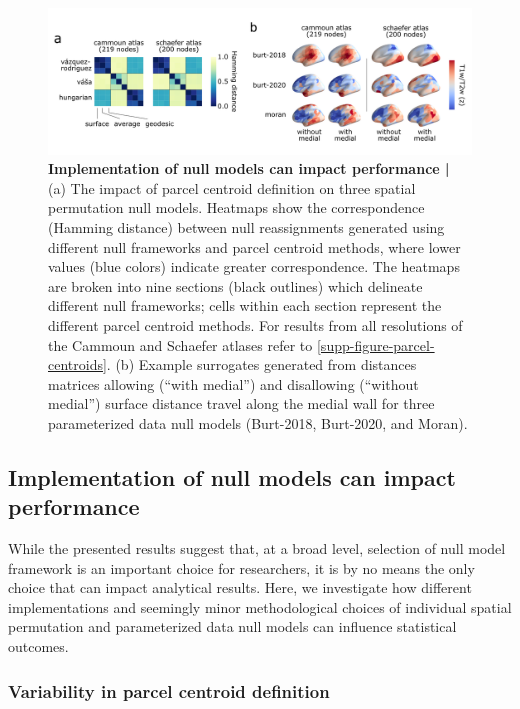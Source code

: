 \documentclass[12pt,aps,pra,reprint,showkeys]{revtex4-1}
\begin{document}
\begin{figure}[htp]
  \begin{center}
    \centerline{\includegraphics[width=\textwidth]{implementation_differences.png}}
    \caption{
      \textbf{Implementation of null models can impact performance |}
      (a) The impact of parcel centroid definition on three spatial permutation null models.
      Heatmaps show the correspondence (Hamming distance) between null reassignments generated using different null frameworks and parcel centroid methods, where lower values (blue colors) indicate greater correspondence.
      The heatmaps are broken into nine sections (black outlines) which delineate different null frameworks; cells within each section represent the different parcel centroid methods.
      For results from all resolutions of the Cammoun and Schaefer atlases refer to \ref{supp-figure-parcel-centroids}.
      (b) Example surrogates generated from distances matrices allowing (``with medial'') and disallowing (``without medial'') surface distance travel along the medial wall for three parameterized data null models (Burt-2018, Burt-2020, and Moran).
    }
    \label{figure-implementation-differences}
  \end{center}
\end{figure}

\subsection*{Implementation of null models can impact performance}

While the presented results suggest that, at a broad level, selection of null model framework is an important choice for researchers, it is by no means the only choice that can impact analytical results.
Here, we investigate how different implementations and seemingly minor methodological choices of individual spatial permutation and parameterized data null models can influence statistical outcomes.

\subsubsection*{Variability in parcel centroid definition}
\end{document}
